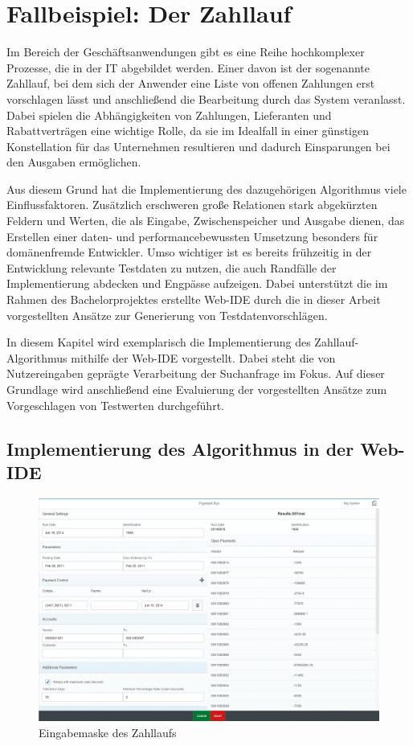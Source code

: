\section{Fallbeispiel: Der Zahllauf}\label{chap:paymentrun}

Im Bereich der Geschäftsanwendungen gibt es eine Reihe hochkomplexer Prozesse, die in der IT abgebildet werden.
Einer davon ist der sogenannte Zahllauf, bei dem sich der Anwender eine Liste von offenen Zahlungen erst vorschlagen lässt und anschließend die Bearbeitung durch das System veranlasst.
Dabei spielen die Abhängigkeiten von Zahlungen, Lieferanten und Rabattverträgen eine wichtige Rolle, da sie im Idealfall in einer günstigen Konstellation für das Unternehmen resultieren und dadurch Einsparungen bei den Ausgaben ermöglichen.

Aus diesem Grund hat die Implementierung des dazugehörigen Algorithmus viele Einflussfaktoren. 
Zusätzlich erschweren große Relationen stark abgekürzten Feldern und Werten, die als Eingabe, Zwischenspeicher und Ausgabe dienen, das Erstellen einer daten- und performancebewussten Umsetzung besonders für domänenfremde Entwickler.
Umso wichtiger ist es bereits frühzeitig in der Entwicklung relevante Testdaten zu nutzen, die auch Randfälle der Implementierung abdecken und Engpässe aufzeigen.
Dabei unterstützt die im Rahmen des Bachelorprojektes erstellte Web-IDE durch die in dieser Arbeit vorgestellten Ansätze zur Generierung von Testdatenvorschlägen.

In diesem Kapitel wird exemplarisch die Implementierung des Zahllauf-Algorithmus mithilfe der Web-IDE vorgestellt.
Dabei steht die von Nutzereingaben geprägte Verarbeitung der Suchanfrage im Fokus.
Auf dieser Grundlage wird anschließend eine Evaluierung der vorgestellten Ansätze zum Vorgeschlagen von Testwerten durchgeführt.

\subsection{Implementierung des Algorithmus in der Web-IDE}

\begin{figure}[ht]
	\centering
  \includegraphics[width=1\textwidth]{figures/paymentrun.png}
	\caption{Eingabemaske des Zahllaufs}
	\label{fig:paymentrun}
\end{figure}

